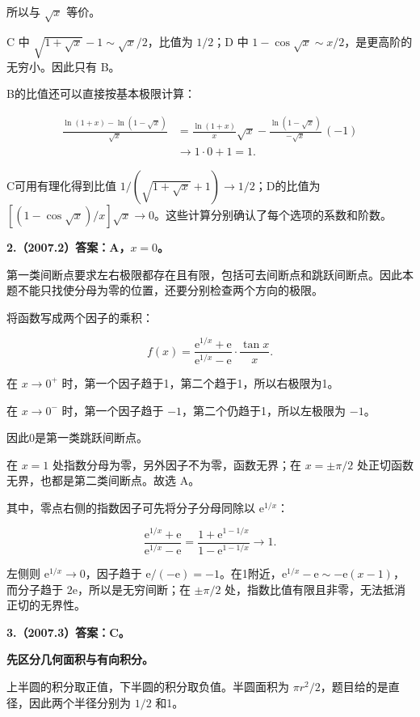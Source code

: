 \documentclass[UTF8,11pt,fontset=windows]{ctexart}
\begin{document}
所以与 $\sqrt x$ 等价。

C 中 $\sqrt{1+\sqrt x}-1\sim\sqrt x/2$，比值为 $1/2$；D 中 $1-\cos\sqrt x\sim x/2$，是更高阶的无穷小。因此只有 B。

B的比值还可以直接按基本极限计算：

$$
\begin{aligned}
\frac{\ln(1+x)-\ln(1-\sqrt x)}{\sqrt x}
&=\frac{\ln(1+x)}x\sqrt x
-\frac{\ln(1-\sqrt x)}{-\sqrt x}\,(-1)\\
&\longrightarrow 1\cdot0+1=1.
\end{aligned}
$$

C可用有理化得到比值 $1/(\sqrt{1+\sqrt x}+1)\to1/2$；D的比值为 $[(1-\cos\sqrt x)/x]\sqrt x\to0$。这些计算分别确认了每个选项的系数和阶数。

\clearpage

\textbf{2.（2007.2）答案：A，$x=0$。}

第一类间断点要求左右极限都存在且有限，包括可去间断点和跳跃间断点。因此本题不能只找使分母为零的位置，还要分别检查两个方向的极限。

将函数写成两个因子的乘积：

$$
f(x)=\frac{\mathrm e^{1/x}+\mathrm e}{\mathrm e^{1/x}-\mathrm e}\cdot\frac{\tan x}{x}.
$$

在 $x\to0^+$ 时，第一个因子趋于1，第二个趋于1，所以右极限为1。

在 $x\to0^-$ 时，第一个因子趋于 $-1$，第二个仍趋于1，所以左极限为 $-1$。

因此0是第一类跳跃间断点。

在 $x=1$ 处指数分母为零，另外因子不为零，函数无界；在 $x=\pm\pi/2$ 处正切函数无界，也都是第二类间断点。故选 A。

其中，零点右侧的指数因子可先将分子分母同除以 $\mathrm e^{1/x}$：

$$
\frac{\mathrm e^{1/x}+\mathrm e}{\mathrm e^{1/x}-\mathrm e}
=\frac{1+\mathrm e^{1-1/x}}{1-\mathrm e^{1-1/x}}\longrightarrow1.
$$

左侧则 $\mathrm e^{1/x}\to0$，因子趋于 $\mathrm e/(-\mathrm e)=-1$。在1附近，$\mathrm e^{1/x}-\mathrm e\sim-\mathrm e(x-1)$，而分子趋于 $2\mathrm e$，所以是无穷间断；在 $\pm\pi/2$ 处，指数比值有限且非零，无法抵消正切的无界性。

\clearpage

\textbf{3.（2007.3）答案：C。}

\textbf{先区分几何面积与有向积分。}

上半圆的积分取正值，下半圆的积分取负值。半圆面积为 $\pi r^2/2$，题目给的是直径，因此两个半径分别为 $1/2$ 和1。
\end{document}

